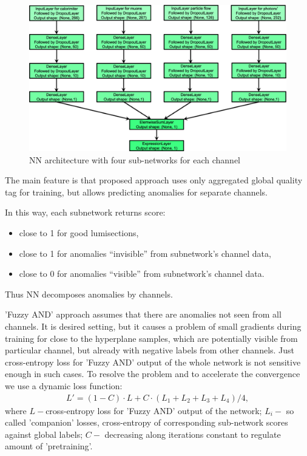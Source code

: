 \documentclass[a4paper]{jpconf}
\begin{document}
\begin{figure}[h!]
\begin{center}
\includegraphics[width=5in]{figures/net.png}
\end{center}
\caption{\label{label}NN architecture with four sub-networks for each channel}
\end{figure}


The main feature is that proposed approach uses only aggregated global quality tag for training, but allows predicting anomalies for separate channels.

In this way, each subnetwork returns score:
\begin{itemize}
\item close to 1 for good lumisections,
\item close to 1 for anomalies “invisible” from subnetwork’s channel data,
\item close to 0 for anomalies “visible” from subnetwork’s channel data.
\end{itemize}

Thus NN decomposes anomalies by channels.


'Fuzzy AND' approach assumes that there are anomalies not seen from all channels. It is desired setting, but it causes a problem of small gradients during training for close to the hyperplane samples, which are potentially visible from particular channel, but already with negative labels from other channels. Just cross-entropy loss for 'Fuzzy AND' output of the whole network is not sensitive enough in such cases. To resolve the problem and to accelerate the convergence we use a dynamic loss function:
\begin{eqnarray}
L' = (1-C) \cdot L + C \cdot (L_1 + L_2 + L_3 + L_4)/ 4 ,
\end{eqnarray}
where $L - $cross-entropy loss for 'Fuzzy AND' output of the network; $L_i - $ so called 'companion' losses, cross-entropy of corresponding sub-network scores against global labels; $C - $ decreasing along iterations constant to regulate amount of 'pretraining'.
\end{document}
